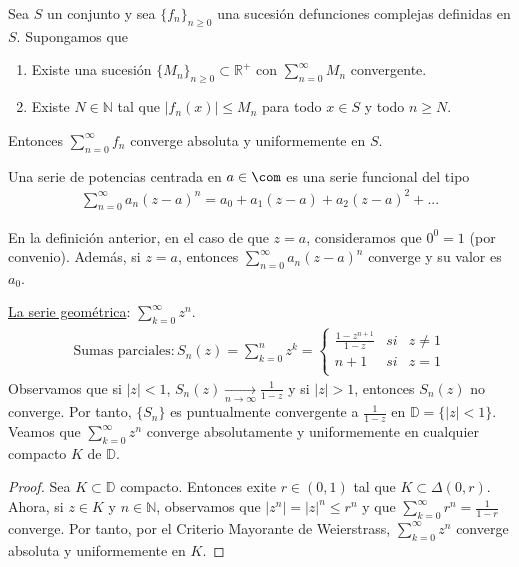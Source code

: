 \begin{prop}
Sea $S$ un conjunto y sea $\{f_n\}_{n \ge 0}$ una sucesión defunciones complejas definidas en $S$. Supongamos que 
\begin{enumerate}
    \item Existe una sucesión $\{M_n\}_{n \ge 0} \subset \mathbb{R}^+$ con $\sum_{n = 0}^{\infty}{M_n}$ convergente.
    \item Existe $N \in \mathbb{N}$ tal que $|f_n(x)| \leq M_n$ para todo $x \in S$ y todo $n \ge N$.
\end{enumerate}
Entonces $\sum_{n=0}^{\infty}{f_n}$ converge absoluta y uniformemente en $S$.
\end{prop}

\begin{defi}
Una serie de potencias centrada en $a \in \com$ es una serie funcional del tipo
\begin{align*}
    \sum_{n=0}^{\infty}{a_n(z-a)^n} = a_0 + a_1(z-a) + a_2(z-a)^2 + ...
\end{align*}
\end{defi}

\begin{obs}
En la definición anterior, en el caso de que $z = a$, consideramos que $0^0 = 1$ (por convenio). Además, si $z = a$, entonces $\sum_{n=0}^{\infty}{a_n(z-a)^n}$ converge y su valor es $a_0$.
\end{obs}

\begin{ejemplo}
\underline{La serie geométrica}: $\sum_{k=0}^{\infty}{z^n}$.
    \begin{align*}
        \text{Sumas parciales}: S_n(z) = \sum_{k=0}^{n}{z^k} = \left\{ \begin{array}{lcc}
            \frac{1-z^{n+1}}{1-z} & si & z \not = 1 \\
            n+1 & si & z = 1\\
             \end{array}
        \right.
    \end{align*}
    Observamos que si $|z| < 1$, $S_n(z) \xrightarrow[n \to \infty]{} \frac{1}{1-z}$ y si $|z| > 1$, entonces $S_n(z)$ no converge. Por tanto, $\{S_n\}$ es puntualmente convergente a $\frac{1}{1-z}$ en $\mathbb{D} = \{|z| < 1\}$.
    \\
    \newline
    Veamos que $\sum_{k=0}^{\infty}{z^n}$ converge absolutamente y uniformemente en cualquier compacto $K$ de $\mathbb{D}$.
    \begin{proof}
    Sea $K \subset \mathbb{D}$ compacto. Entonces exite $r \in (0,1)$ tal que $K \subset \Delta(0,r)$. Ahora, si $z \in K$ y $n \in \mathbb{N}$, observamos que $|z^n| = |z|^n \leq r^n$ y que $\sum_{k=0}^{\infty}{r^n} = \frac{1}{1-r}$ converge. Por tanto, por el Criterio Mayorante de Weierstrass, $\sum_{k=0}^{\infty}{z^n}$ converge absoluta y uniformemente en $K$. 
    \end{proof}
\end{ejemplo}

